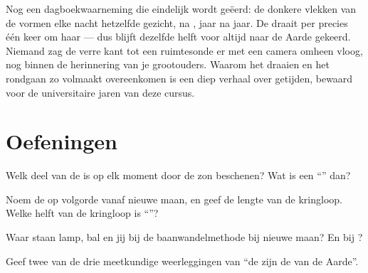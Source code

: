 \begin{remark}\label{rem:g7:moon-phases:sameface}
Nog een dagboekwaarneming die eindelijk wordt geëerd: de donkere
vlekken van de  vormen elke nacht hetzelfde gezicht,
 na , jaar na jaar. De 
draait per  precies één keer om haar  --- dus blijft
dezelfde helft voor altijd naar de Aarde gekeerd. Niemand zag de verre
kant tot een ruimtesonde er met een camera omheen vloog, nog binnen de
herinnering van je grootouders. Waarom het draaien en het rondgaan zo
volmaakt overeenkomen is een diep verhaal over getijden, bewaard voor
de universitaire jaren van deze cursus.
\end{remark}

\section{Oefeningen}

\begin{exercise}[$\star$]\label{exo:g7:moon-phases:1}
Welk deel van de  is op elk moment door de zon beschenen? Wat is
een ``'' dan?
\end{exercise}

\begin{exercise}[$\star$]\label{exo:g7:moon-phases:2}
Noem de  op volgorde vanaf nieuwe maan, en geef de
lengte van de kringloop. Welke helft van de kringloop is
``''?
\end{exercise}

\begin{exercise}[$\star$]\label{exo:g7:moon-phases:3}
Waar staan lamp, bal en jij bij de baanwandelmethode bij nieuwe maan?
En bij ?
\end{exercise}

\begin{exercise}[$\star$]\label{exo:g7:moon-phases:4}
Geef twee van de drie meetkundige weerleggingen van ``de
 zijn de  van de Aarde''.
\end{exercise}

